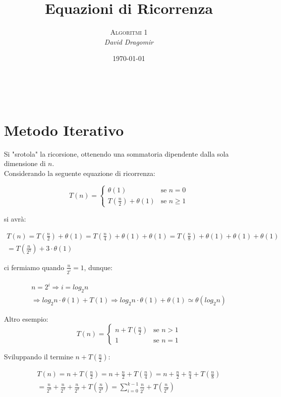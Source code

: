 \documentclass[a4paper, 12pt]{article} %
\title{\textbf{Equazioni di Ricorrenza}} %
\author{\textsc{Algoritmi 1}\\ \em David Dragomir} %
\date{\today} %
\makeatletter
\renewcommand{\maketitle}{ %
\begin{flushright} %
{\LARGE\@title} %

\vspace{10pt} %

{\@author} %
\\\@date %

\vspace{30pt} %
\end{flushright}
}
\makeatother
\begin{document}
\maketitle %

\thispagestyle{empty}


\section*{Metodo Iterativo}

Si "srotola" la ricorsione, ottenendo una sommatoria dipendente dalla
sola dimensione di $n$. \\

Considerando la seguente equazione di ricorrenza:

$$
T(n) = \begin{cases}
  \theta(1) & \text{se $n=0$} \\
  T(\frac{n}{2}) + \theta(1) & \text{se $n \geq 1$}
\end{cases}
$$

si avrà:

\begin{gather*}
T(n) = T(\frac{n}{2}) + \theta(1) = T(\frac{n}{4}) + \theta(1) + \theta(1) = 
T(\frac{n}{8}) + \theta(1) + \theta(1) + \theta(1) \\
= T(\frac{n}{2^{3}}) + 3 \cdot \theta(1)
\end{gather*}

ci fermiamo quando $\frac{n}{2^{i}} = 1$, dunque:

\begin{gather*}
n = 2^{i} \Rightarrow i = log_{2} n \\
  \Rightarrow log_{2}n \cdot \theta(1) + T(1) \Rightarrow log_{2}n
  \cdot \theta(1) + \theta(1) \simeq \theta(log_{2} n)
\end{gather*}

Altro esempio:
$$
T(n) = \begin{cases}
  n + T(\frac{n}{2}) & \text{se $n > 1$} \\
  1 & \text{se $n = 1$} 
\end{cases}
$$

Sviluppando il termine $n + T(\frac{n}{2})$:

\begin{gather*}
  T(n) = n + T(\frac{n}{2}) = n + \frac{n}{2} + T(\frac{n}{4}) =
  n + \frac{n}{2} + \frac{n}{4} + T(\frac{n}{8}) \\
  = \frac{n}{2^{0}} + \frac{n}{2^{1}} + \frac{n}{2^{2}} + T(\frac{n}{2^{3}}) = \sum_{i = 0}^{k - 1} \frac{n}{2^{i}} + T(\frac{n}{2^k})
\end{gather*}
\end{document}
